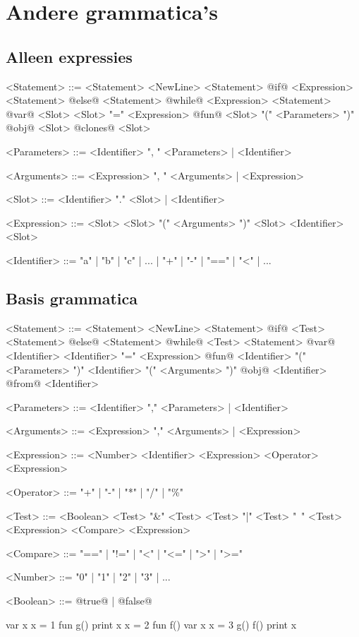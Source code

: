\chapter{Andere grammatica's}

\section{Alleen expressies}

\begin{grammar}
<Statement>  ::= <Statement> <NewLine> <Statement>
            \alt @if@ <Expression> <Statement> @else@ <Statement>
            \alt @while@ <Expression> <Statement>
            \alt @var@ <Slot>
            \alt <Slot> "=" <Expression>
            \alt @fun@ <Slot> "(" <Parameters> ")"
            \alt @obj@ <Slot> @clones@ <Slot>

<Parameters> ::= <Identifier> ", " <Parameters> | <Identifier>

<Arguments>  ::= <Expression> ", " <Arguments>  | <Expression>

<Slot>       ::= <Identifier> "." <Slot> | <Identifier>

<Expression> ::= <Slot>
            \alt <Slot> "(" <Arguments> ")"
            \alt <Slot> <Identifier> <Slot>

<Identifier> ::= "a" | "b" | "c" | ... | "+" | "-" | "==" | "<" | ...
\end{grammar}

\section{Basis grammatica}

\begin{grammar}
<Statement>  ::= <Statement> <NewLine> <Statement>
            \alt @if@ <Test> <Statement> @else@ <Statement>
            \alt @while@ <Test> <Statement>
            \alt @var@ <Identifier> 
            \alt <Identifier> "=" <Expression>
            \alt @fun@ <Identifier> "(" <Parameters> ")"
            \alt <Identifier> "(" <Arguments> ")"
            \alt @obj@ <Identifier> @from@ <Identifier>

<Parameters> ::= <Identifier> "," <Parameters> | <Identifier>

<Arguments>  ::= <Expression> "," <Arguments>  | <Expression>

<Expression> ::= <Number>
            \alt <Identifier>
            \alt <Expression> <Operator> <Expression>

<Operator>   ::= "+" | "-" | "*" | "/" | "\%"

<Test>       ::= <Boolean>
            \alt <Test> "\&" <Test>
            \alt <Test> "|"  <Test>
            \alt "~" <Test>
            \alt <Expression> <Compare> <Expression>

<Compare>    ::= "==" | "!=" | "<" | "<=" | ">" | ">="

<Number>     ::= "0" | "1" | "2" | "3" | ...

<Boolean>    ::= @true@ | @false@
\end{grammar}


\begin{program}
var x
x = 1
fun g()
    print x
    x = 2
fun f()
    var x
    x = 3
    g()
f()
print x
\end{program}

